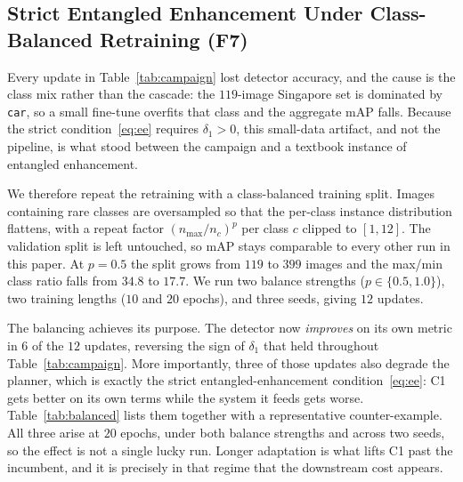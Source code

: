 \documentclass[conference]{IEEEtran}
\begin{document}
\subsection{Strict Entangled Enhancement Under Class-Balanced
Retraining (F7)}
\label{sec:res-balanced}
Every update in Table~\ref{tab:campaign} lost detector accuracy, and the cause is
the class mix rather than the cascade: the $119$-image Singapore set is dominated
by \texttt{car}, so a small fine-tune overfits that class and the aggregate mAP
falls. Because the strict condition~\eqref{eq:ee} requires $\delta_1 > 0$, this
small-data artifact, and not the pipeline, is what stood between the campaign and
a textbook instance of entangled enhancement.

We therefore repeat the retraining with a class-balanced training split. Images
containing rare classes are oversampled so that the per-class instance
distribution flattens, with a repeat factor $(n_{\max}/n_c)^{p}$ per class $c$
clipped to $[1,12]$. The validation split is left untouched, so mAP stays
comparable to every other run in this paper. At $p{=}0.5$ the split grows from
$119$ to $399$ images and the max/min class ratio falls from $34.8$ to $17.7$. We
run two balance strengths ($p \in \{0.5, 1.0\}$), two training lengths
($10$ and $20$ epochs), and three seeds, giving $12$ updates.

The balancing achieves its purpose. The detector now \emph{improves} on its own
metric in $6$ of the $12$ updates, reversing the sign of $\delta_1$ that held
throughout Table~\ref{tab:campaign}. More importantly, three of those updates
also degrade the planner, which is exactly the strict entangled-enhancement
condition~\eqref{eq:ee}: C1 gets better on its own terms while the system it
feeds gets worse. Table~\ref{tab:balanced} lists them together with a
representative counter-example. All three arise at $20$ epochs, under both
balance strengths and across two seeds, so the effect is not a single lucky run.
Longer adaptation is what lifts C1 past the incumbent, and it is precisely in
that regime that the downstream cost appears.
\end{document}
